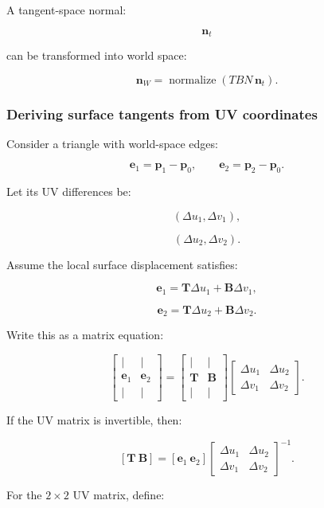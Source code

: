 A tangent-space normal:

\[
 \mathbf n_t
\]

can be transformed into world space:

\[
 \boxed{ \mathbf n_W= \operatorname{normalize}(TBN\,\mathbf n_t) }.
\]

\subsubsection{Deriving surface tangents from UV coordinates}\label{02-foundations-ii-ch032-deriving-surface-tangents-from-uv-coordinates}

Consider a triangle with world-space edges:

\[
 \mathbf e_1=\mathbf p_1-\mathbf p_0, \qquad \mathbf e_2=\mathbf p_2-\mathbf p_0.
\]

Let its UV differences be:

\[
 (\Delta u_1,\Delta v_1),
\]

\[
 (\Delta u_2,\Delta v_2).
\]

Assume the local surface displacement satisfies:

\[
 \mathbf e_1=\mathbf T\Delta u_1+\mathbf B\Delta v_1,
\]

\[
 \mathbf e_2=\mathbf T\Delta u_2+\mathbf B\Delta v_2.
\]

Write this as a matrix equation:

\[
 \begin{bmatrix} |&|\\ \mathbf e_1&\mathbf e_2\\ |&| \end{bmatrix} = \begin{bmatrix} |&|\\ \mathbf T&\mathbf B\\ |&| \end{bmatrix} \begin{bmatrix} \Delta u_1&\Delta u_2\\ \Delta v_1&\Delta v_2 \end{bmatrix}.
\]

If the UV matrix is invertible, then:

\[
 \boxed{ [\mathbf T\ \mathbf B] = [\mathbf e_1\ \mathbf e_2] \begin{bmatrix} \Delta u_1&\Delta u_2\\ \Delta v_1&\Delta v_2 \end{bmatrix}^{-1} }.
\]

For the \(2\times2\) UV matrix, define:

